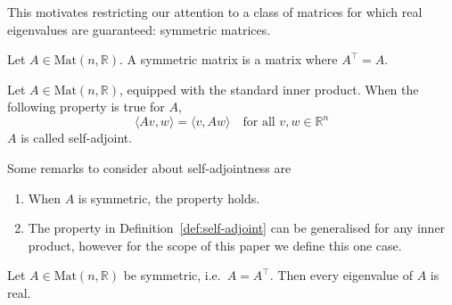 		This motivates restricting our attention to a class of matrices for which real eigenvalues are guaranteed: symmetric matrices.
		
		\begin{definition}
			\label{def:symmetric-matrix}
			Let $A \in \mathrm{Mat}(n, \mathbb{R})$. A symmetric matrix is a matrix where $A^\top = A$.
		\end{definition}
		
		\begin{definition}
			\label{def:self-adjoint}
			Let $A \in \mathrm{Mat}(n,\mathbb{R})$, equipped with the standard inner product. When the following property is true for $A$,
			\[
				\langle Av,w\rangle = \langle v,Aw\rangle \quad \text{for all } v,w \in \mathbb{R}^n
			\]
			$A$ is called self-adjoint.
		\end{definition}
		
		\begin{remark}
			\label{rem:self-adjoint}
			Some remarks to consider about self-adjointness are
			\begin{enumerate}[label=\roman*.]
				\item When $A$ is symmetric, the property holds.
				\item The property in Definition~\ref{def:self-adjoint} can be generalised for any inner product, however for the scope of this paper we define this one case.
			\end{enumerate}
		\end{remark}
		
		\begin{theorem}
			\label{thm:symmetric-real-eigenvalues}
			Let $A \in \mathrm{Mat}(n,\mathbb{R})$ be symmetric, i.e.\ $A = A^\top$. Then every eigenvalue of $A$ is real.
		\end{theorem}
		
